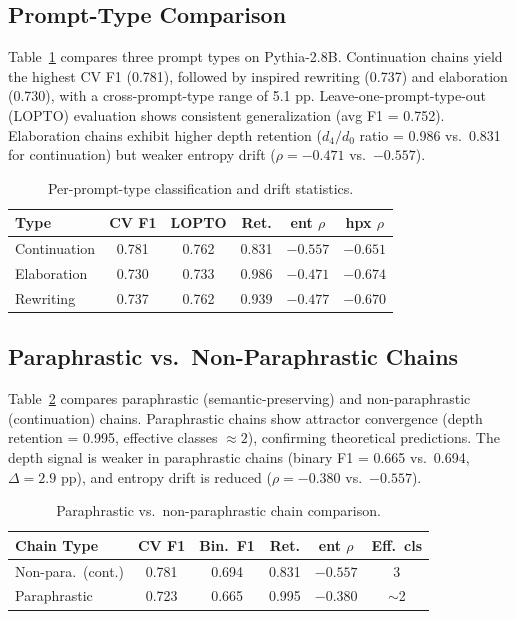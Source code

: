 \documentclass[11pt]{article}
\begin{document}
\subsection{Prompt-Type Comparison}
\label{sec:prompt}

Table~\ref{tab:prompt} compares three prompt types on Pythia-2.8B. Continuation chains yield the highest CV F1 (0.781), followed by inspired rewriting (0.737) and elaboration (0.730), with a cross-prompt-type range of 5.1 pp. Leave-one-prompt-type-out (LOPTO) evaluation shows consistent generalization (avg F1 = 0.752). Elaboration chains exhibit higher depth retention ($d_4/d_0$ ratio = 0.986 vs.\ 0.831 for continuation) but weaker entropy drift ($\rho = -0.471$ vs.\ $-0.557$).

\begin{table}[t]
\centering
\small
\caption{Per-prompt-type classification and drift statistics.}
\label{tab:prompt}
\begin{tabular}{lccccc}
\toprule
\textbf{Type} & \textbf{CV F1} & \textbf{LOPTO} & \textbf{Ret.} & \textbf{ent $\rho$} & \textbf{hpx $\rho$} \\
\midrule
Continuation & 0.781 & 0.762 & 0.831 & $-0.557$ & $-0.651$ \\
Elaboration & 0.730 & 0.733 & 0.986 & $-0.471$ & $-0.674$ \\
Rewriting & 0.737 & 0.762 & 0.939 & $-0.477$ & $-0.670$ \\
\bottomrule
\end{tabular}
\end{table}

\subsection{Paraphrastic vs.\ Non-Paraphrastic Chains}
\label{sec:para}

Table~\ref{tab:para} compares paraphrastic (semantic-preserving) and non-paraphrastic (continuation) chains. Paraphrastic chains show attractor convergence (depth retention = 0.995, effective classes $\approx 2$), confirming theoretical predictions. The depth signal is weaker in paraphrastic chains (binary F1 = 0.665 vs.\ 0.694, $\Delta = 2.9$ pp), and entropy drift is reduced ($\rho = -0.380$ vs.\ $-0.557$).

\begin{table}[t]
\centering
\small
\caption{Paraphrastic vs.\ non-paraphrastic chain comparison.}
\label{tab:para}
\begin{tabular}{lccccc}
\toprule
\textbf{Chain Type} & \textbf{CV F1} & \textbf{Bin.\ F1} & \textbf{Ret.} & \textbf{ent $\rho$} & \textbf{Eff.\ cls} \\
\midrule
Non-para.\ (cont.) & 0.781 & 0.694 & 0.831 & $-0.557$ & 3 \\
Paraphrastic & 0.723 & 0.665 & 0.995 & $-0.380$ & $\sim$2 \\
\bottomrule
\end{tabular}
\end{table}
\end{document}

